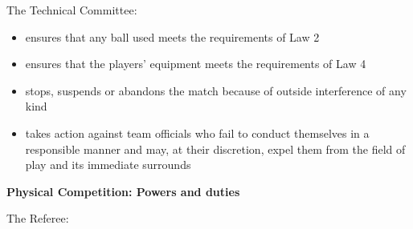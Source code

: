 \bigskip

The Technical Committee:

\begin{itemize}
\item ensures that any ball used meets the requirements of Law 2
\item ensures that the players' equipment meets the requirements of Law 4
\item stops, suspends or abandons the match because of outside interference of any kind
\item takes action against team officials who fail to conduct themselves in a responsible manner and may, at their discretion, expel them from the field of play and its immediate surrounds
\end{itemize}

\bigskip

{\bfseries Physical Competition: Powers and duties}

\headlinebox

The Referee:

